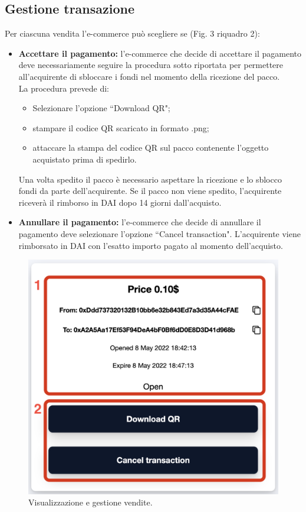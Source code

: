 \documentclass[a4paper, 12pt]{article}
\begin{document}
\subsection{Gestione transazione}
Per ciascuna vendita l'e-commerce può scegliere se (Fig. 3 riquadro 2):
\begin{itemize}
  \item \textbf{Accettare il pagamento:} l'e-commerce che decide di accettare il pagamento deve necessariamente seguire la procedura sotto riportata per permettere all'acquirente di sbloccare i fondi nel momento della ricezione del pacco.\\
  La procedura prevede di:
  \begin{itemize}
    \item Selezionare l'opzione ``Download QR";
    \item stampare il codice QR scaricato in formato .png;
    \item attaccare la stampa del codice QR sul pacco contenente l'oggetto acquistato prima di spedirlo.
  \end{itemize}
  Una volta spedito il pacco è necessario aspettare la ricezione e lo sblocco fondi da parte dell'acquirente. Se il pacco non viene spedito, l'acquirente riceverà il rimborso in DAI dopo 14 giorni dall'acquisto.\\
  \item \textbf{Annullare il pagamento:} l'e-commerce che decide di annullare il pagamento deve selezionare l'opzione ``Cancel transaction". L'acquirente viene rimborsato in DAI con l'esatto importo pagato al momento dell'acquisto.
\end{itemize}
\FloatBarrier
\begin{figure}[!h]
\centering
\includegraphics[width=0.7\linewidth]{img/transazione_venditore.png}
\caption{Visualizzazione e gestione vendite.}
\end{figure}
\FloatBarrier
\end{document}

